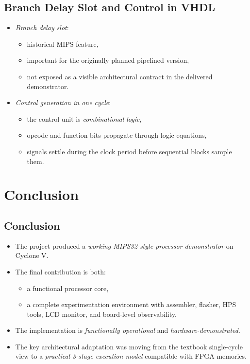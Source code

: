 \documentclass[11pt]{article}
\begin{document}
\subsection*{Branch Delay Slot and Control in VHDL}
\label{sec:orgfa2321d}
\begin{itemize}
\item \emph{Branch delay slot}:
\begin{itemize}
\item historical MIPS feature,
\item important for the originally planned pipelined version,
\item not exposed as a visible architectural contract in the delivered demonstrator.
\end{itemize}
\item \emph{Control generation in one cycle}:
\begin{itemize}
\item the control unit is \emph{combinational logic},
\item opcode and function bits propagate through logic equations,
\item signals settle during the clock period before sequential blocks sample them.
\end{itemize}
\end{itemize}
\section*{Conclusion}
\label{sec:org7ef92d8}
\subsection*{Conclusion}
\label{sec:orgf748fe4}
\begin{itemize}
\item The project produced a \emph{working MIPS32-style processor demonstrator} on Cyclone V.
\item The final contribution is both:
\begin{itemize}
\item a functional processor core,
\item a complete experimentation environment with assembler, flasher, HPS tools, LCD monitor, and board-level observability.
\end{itemize}
\item The implementation is \emph{functionally operational} and \emph{hardware-demonstrated}.
\item The key architectural adaptation was moving from the textbook single-cycle view to a \emph{practical 3-stage execution model} compatible with FPGA memories.
\end{itemize}
\end{document}
